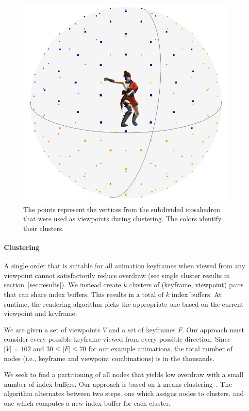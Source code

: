 \begin{figure}[t]
\centering
\includegraphics[width = .8\columnwidth]{images/modelview.png}%
\caption{The points represent the vertices from the subdivided icosahedron that were used as viewpoints during clustering. The colors identify their clusters.}
\label{fig:modelview}
\end{figure}

\paragraph{Clustering}
A single order that is suitable for all animation keyframes when viewed from any viewpoint cannot satisfactorily reduce overdraw (see single cluster results in section~\ref{sec:results}).
We instead create $k$ clusters of (keyframe, viewpoint) pairs that can share index buffers. This results in a total of $k$ index buffers. At runtime, the rendering algorithm picks the appropriate one based on the current viewpoint and keyframe. 

We are given a set of viewpoints $V$ and a set of keyframes $F$. Our approach must consider every possible keyframe viewed from every possible direction. Since $|V| = 162$ and $30 \leq |F| \leq 70$ for our example animations, the total number of nodes (i.e., keyframe and viewpoint combinations) is in the thousands.

We seek to find a partitioning of all nodes that yields low overdraw with a small number of index buffers. Our approach is based on k-means clustering~\citep{MacQueen67}. The algorithm alternates between two steps, one which assigns nodes to clusters, and one which computes a new index buffer for each cluster.

